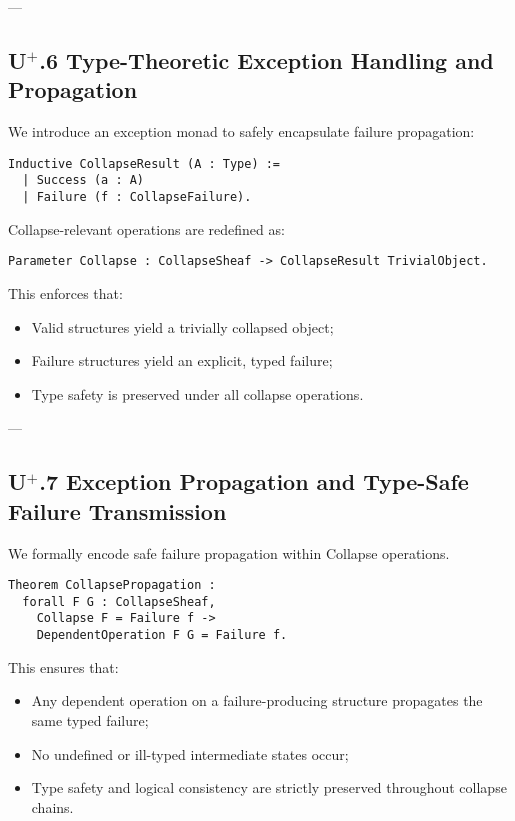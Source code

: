\documentclass[11pt]{article}
\begin{document}
---

\subsection*{U$^{+}$.6 Type-Theoretic Exception Handling and Propagation}

We introduce an exception monad to safely encapsulate failure propagation:

\begin{lstlisting}[language=Coq]
Inductive CollapseResult (A : Type) :=
  | Success (a : A)
  | Failure (f : CollapseFailure).
\end{lstlisting}

Collapse-relevant operations are redefined as:

\begin{lstlisting}[language=Coq]
Parameter Collapse : CollapseSheaf -> CollapseResult TrivialObject.
\end{lstlisting}

This enforces that:

\begin{itemize}
    \item Valid structures yield a trivially collapsed object;
    \item Failure structures yield an explicit, typed failure;
    \item Type safety is preserved under all collapse operations.
\end{itemize}

---

\subsection*{U$^{+}$.7 Exception Propagation and Type-Safe Failure Transmission}

We formally encode safe failure propagation within Collapse operations.

\begin{lstlisting}[language=Coq]
Theorem CollapsePropagation :
  forall F G : CollapseSheaf,
    Collapse F = Failure f ->
    DependentOperation F G = Failure f.
\end{lstlisting}

This ensures that:

\begin{itemize}
    \item Any dependent operation on a failure-producing structure propagates the same typed failure;
    \item No undefined or ill-typed intermediate states occur;
    \item Type safety and logical consistency are strictly preserved throughout collapse chains.
\end{itemize}
\end{document}
